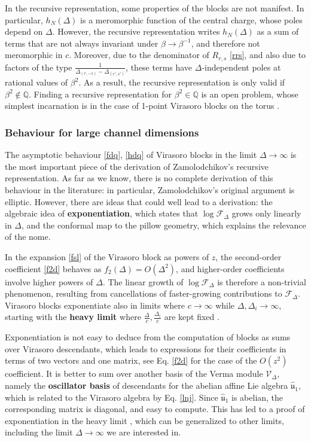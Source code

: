 \documentclass[12pt, a4paper]{article}
\newcommand{\myindex}[1]{\textbf{\boldmath #1}}
\theoremstyle{break}
\begin{document}
In the recursive representation, some properties of the blocks are not manifest. In particular, $h_N(\Delta)$ is a meromorphic function of the central charge, whose poles depend on $\Delta$. However, the recursive representation writes $h_N(\Delta)$ as a sum of terms that are not always invariant under $\beta\to \beta^{-1}$, and therefore not meromorphic in $c$. Moreover, due to the denominator of $R_{r,s}$ \eqref{rrs}, and also due to factors of the type $\frac{1}{\Delta_{(r,-s)}-\Delta_{(r',s')}}$, these terms have $\Delta$-independent poles at rational values of $\beta^2$. As a result, the recursive representation is only valid if $\beta^2\notin\mathbb{Q}$. Finding a recursive representation for $\beta^2\in \mathbb{Q}$ is an open problem, whose simplest incarnation is in the case of 1-point Virasoro blocks on the torus \cite{sto22}. 

\subsubsection{Behaviour for large channel dimensions} \label{sec:bld}

The asymptotic behaviour \eqref{fdq}, \eqref{hdq} of Virasoro blocks in the limit $\Delta\to\infty$ is the most important piece of the derivation of Zamolodchikov's recursive representation. As far as we know, there is no complete derivation of this behaviour in the literature: in particular, Zamolodchikov's original argument \cite{zam87b} is elliptic. However, there are ideas that could well lead to a derivation: the algebraic idea of \myindex{exponentiation}, which states that $\log\mathcal{F}_\Delta$ grows only linearly in $\Delta$, and the conformal map to the pillow geometry, which explains the relevance of the nome. 

In the expansion \eqref{fsl} of the Virasoro block as powers of $z$, the second-order coefficient \eqref{f2d} behaves as $f_2(\Delta)= O(\Delta^2)$, and higher-order coefficients involve higher powers of $\Delta$. 
The linear growth of $\log\mathcal{F}_\Delta$ is therefore a non-trivial phenomenon, resulting from cancellations of faster-growing contributions to $\mathcal{F}_\Delta$. Virasoro blocks exponentiate also in limits where $c\to\infty$ while $\Delta,\Delta_i\to \infty$, starting with the \myindex{heavy limit} where $\frac{\Delta}{c},\frac{\Delta_i}{c}$ are kept fixed \cite{al24}. 

Exponentiation is not easy to deduce from the computation of blocks as sums over Virasoro descendants, which leads to expressions for their coefficients in terms of two vectors and one matrix, see Eq. \eqref{f2d} for the case of the $O(z^2)$ coefficient. It is better to sum over another basis of the Verma module $\mathcal{V}_\Delta$, namely the \myindex{oscillator basis} of descendants for the abelian affine Lie algebra $\hat{\mathfrak{u}}_1$, which is related to the Virasoro algebra by Eq. \eqref{lnj}. Since $\hat{\mathfrak{u}}_1$ is abelian, the corresponding matrix is diagonal, and easy to compute. This has led to a proof of exponentiation in the heavy limit \cite{bdk19}, which can be generalized to other limits, including the limit $\Delta\to \infty$ we are interested in. 
\end{document}
